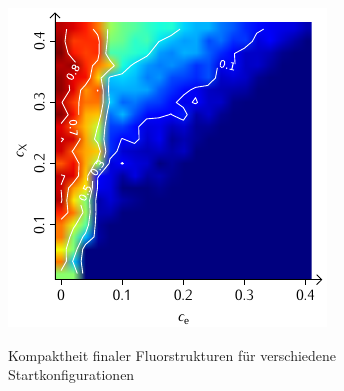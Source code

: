 \documentclass[a4paper, 10pt, twoside, openany]{book} %
\begin{document}
\begin{figure}
\begin{minipage}[t]{0.48\textwidth}
			\label{F_individual_K}
		\end{minipage}
		\hfill
		\begin{minipage}[t]{0.48\textwidth}
			\includegraphics[width=\textwidth]{Abbildungen/Phasendiagramme/Konturen/F_penalty_individual_K.pdf}
			\label{F_penalty_individual_K}
		\end{minipage}
		\caption[Kompaktheit finaler Fluorstrukturen]{Kompaktheit finaler Fluorstrukturen für verschiedene Startkonfigurationen}
		\label{F_K}
	\end{figure}
	
\end{document}

